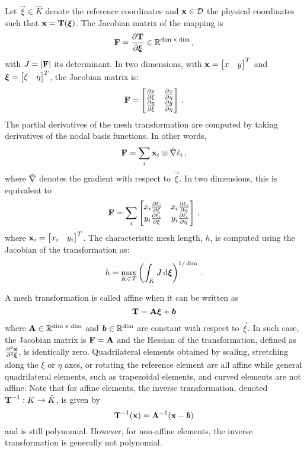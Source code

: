 \documentclass[../doc.tex]{subfiles}
\begin{document}
Let $\vec{\xi} \in \hat{K}$ denote the reference coordinates and $\boldsymbol{\mathrm{x}} \in \mathcal{D}$ the physical coordinates such that $\boldsymbol{\mathrm{x}} = \boldsymbol{\mathrm{T}}(\boldsymbol{\xi})$. The Jacobian matrix of the mapping is 
	\begin{equation}
		\boldsymbol{\mathrm{F}} = \frac{\partial \boldsymbol{\mathrm{T}}}{\partial \boldsymbol{\xi}} \in \mathbb{R}^{\dim\times\dim} \,, 
	\end{equation}
with $J = |\boldsymbol{\mathrm{F}}|$ its determinant. 
In two dimensions, with $\boldsymbol{\mathrm{x}} = \begin{bmatrix} x & y \end{bmatrix}^T$ and $\boldsymbol{\xi} = \begin{bmatrix} \xi & \eta \end{bmatrix}^T$, the Jacobian matrix is: 
	\begin{equation}
		\boldsymbol{\mathrm{F}} = \begin{bmatrix} 
			\frac{\partial x}{\partial \xi} & \frac{\partial x}{\partial \eta} \\ 
			\frac{\partial y}{\partial \xi} & \frac{\partial y}{\partial \eta} 
		\end{bmatrix} \,.
	\end{equation}
The partial derivatives of the mesh transformation are computed by taking derivatives of the nodal basis functions. In other words, 
	\begin{equation}
		\boldsymbol{\mathrm{F}} = \sum_i \boldsymbol{\mathrm{x}}_{i} \otimes \hat{\nabla} \ell_i \,,
	\end{equation}
where $\hat{\nabla}$ denotes the gradient with respect to $\vec{\xi}$. In two dimensions, this is equivalent to 
	\begin{equation}
		\boldsymbol{\mathrm{F}} = \sum_{i} \begin{bmatrix} 
			x_{i} \frac{\partial \ell_i}{\partial \xi} & x_{i} \frac{\partial \ell_i}{\partial \eta} \\
			y_{i} \frac{\partial \ell_i}{\partial \xi} & y_{i} \frac{\partial \ell_i}{\partial \eta} 
		\end{bmatrix} \,, 
	\end{equation}
where $\boldsymbol{\mathrm{x}}_{i} = \begin{bmatrix} x_{i} & y_{i} \end{bmatrix}^T$. 
The characteristic mesh length, $h$, is computed using the Jacobian of the transformation as: 
	\begin{equation}
		h = \max_{K\in\mathcal{T}} \left( \int_{\hat{K}} J \mathop{}\!\mathrm{d}\boldsymbol{\xi} \right)^{1/\dim} \,.
	\end{equation}

A mesh transformation is called affine when it can be written as
	\begin{equation}
		\boldsymbol{\mathrm{T}} = \boldsymbol{\mathrm{A}}\boldsymbol{\xi} + \boldsymbol{b}
	\end{equation}
where $\boldsymbol{\mathrm{A}}\in\mathbb{R}^{\dim\times\dim}$ and $\boldsymbol{b}\in\mathbb{R}^{\dim}$ are constant with respect to $\vec{\xi}$. In such case, the Jacobian matrix is $\boldsymbol{\mathrm{F}} = \boldsymbol{\mathrm{A}}$ and the Hessian of the transformation, defined as $\frac{\partial^2 \boldsymbol{\mathrm{x}}}{\partial^2 \boldsymbol{\xi}}$, is identically zero. Quadrilateral elements obtained by scaling, stretching along the $\xi$ or $\eta$ axes, or rotating the reference element are all affine while general quadrilateral elements, such as trapezoidal elements, and curved elements are not affine. Note that for affine elements, the inverse transformation, denoted $\boldsymbol{\mathrm{T}}^{-1} : K \rightarrow \hat{K}$, is given by  
	\begin{equation}
		\boldsymbol{\mathrm{T}}^{-1}(\boldsymbol{\mathrm{x}}) = \boldsymbol{\mathrm{A}}^{-1}(\boldsymbol{\mathrm{x}} - \boldsymbol{b})
	\end{equation}
and is still polynomial. However, for non-affine elements, the inverse transformation is generally not polynomial. 
\end{document}

